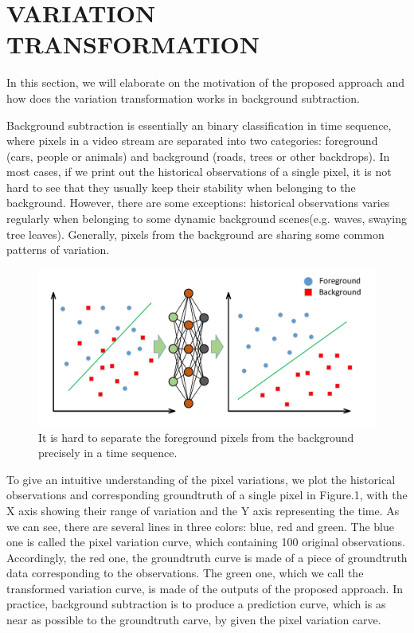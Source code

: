 \documentclass[journal]{IEEEtran}
\begin{document}
\section{VARIATION TRANSFORMATION}
In this section, we will elaborate on the motivation of the proposed approach and how does the variation transformation works in background subtraction.

Background subtraction is essentially an binary classification in time sequence, where pixels in a video stream are separated into two categories: foreground (cars, people or animals) and background (roads, trees or other backdrops). 
In most cases, if we print out the historical observations of a single pixel, it is not hard to see that they usually keep their stability when belonging to the background. 
However, there are some exceptions: historical observations varies regularly when belonging to some dynamic background scenes(e.g. 
waves, swaying tree leaves). 
Generally, pixels from the background are sharing some common patterns of variation. 


\begin{figure}[!t]	%
\centering
    \includegraphics[width=\linewidth]{figure/fig1}
    \caption{It is hard to separate the foreground pixels from the background precisely in a time sequence.}
    \label{variation_chart}
\end{figure}



To give an intuitive understanding of the pixel variations, we plot the historical observations and corresponding groundtruth of a single pixel in Figure.1, with the X axis showing their range of variation and the Y axis representing the time. 
As we can see, there are several lines in three colors: blue, red and green. 
The blue one is called the pixel variation curve, which containing 100 original observations. 
Accordingly, the red one, the groundtruth curve is made of a piece of groundtruth data corresponding to the observations. 
The green one, which we call the transformed variation curve, is made of the outputs of the proposed approach. 
In practice, background subtraction is to produce a prediction curve, which is as near as possible to the groundtruth carve, by given the pixel variation carve. 
\end{document}
